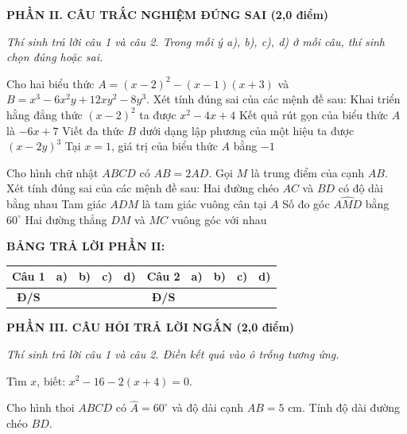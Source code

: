 \documentclass[12pt,a4paper]{article}
\begin{document}
\setcounter{ex}{0}
\noindent\textbf{\large PHẦN II. CÂU TRẮC NGHIỆM ĐÚNG SAI (2,0 điểm)}

\textit{Thí sinh trả lời câu 1 và câu 2. Trong mỗi ý a), b), c), d) ở mỗi câu, thí sinh chọn đúng hoặc sai.}

\vspace{1mm}
\begin{ex}
Cho hai biểu thức $A = (x - 2)^2 - (x - 1)(x + 3)$ và $B = x^3 - 6x^2y + 12xy^2 - 8y^3$. Xét tính đúng sai của các mệnh đề sau:
\choiceTF
{\True Khai triển hằng đẳng thức $(x - 2)^2$ ta được $x^2 - 4x + 4$}
{\True Kết quả rút gọn của biểu thức $A$ là $-6x + 7$}
{\True Viết đa thức $B$ dưới dạng lập phương của một hiệu ta được $(x - 2y)^3$}
{Tại $x = 1$, giá trị của biểu thức $A$ bằng $-1$}
\end{ex}

\begin{ex}
Cho hình chữ nhật $ABCD$ có $AB = 2AD$. Gọi $M$ là trung điểm của cạnh $AB$. Xét tính đúng sai của các mệnh đề sau:
\choiceTF
{\True Hai đường chéo $AC$ và $BD$ có độ dài bằng nhau}
{\True Tam giác $ADM$ là tam giác vuông cân tại $A$}
{Số đo góc $\widehat{AMD}$ bằng $60^\circ$}
{\True Hai đường thẳng $DM$ và $MC$ vuông góc với nhau}
\end{ex}


\noindent\textbf{BẢNG TRẢ LỜI PHẦN II:}
\begin{center}
\begin{tabular}{|c|c|c|c|c||c|c|c|c|c|}
\hline
\textbf{Câu 1} & \textbf{a)} & \textbf{b)} & \textbf{c)} & \textbf{d)} & \textbf{Câu 2} & \textbf{a)} & \textbf{b)} & \textbf{c)} & \textbf{d)} \\
\hline
\textbf{Đ/S} & \rule{0pt}{0.6cm} & & & & \textbf{Đ/S} & & & & \\
\hline
\end{tabular}
\end{center}
\vspace{2mm}

\setcounter{ex}{0}
\noindent\textbf{\large PHẦN III. CÂU HỎI TRẢ LỜI NGẮN (2,0 điểm)}

\textit{Thí sinh trả lời câu 1 và câu 2. Điền kết quả vào ô trống tương ứng.}

\vspace{1mm}
\begin{ex}
Tìm $x$, biết: $x^2 - 16 - 2(x + 4) = 0$. 
\end{ex}

\begin{ex}
Cho hình thoi $ABCD$ có $\widehat{A} = 60^\circ$ và độ dài cạnh $AB = 5\text{ cm}$. Tính độ dài đường chéo $BD$. 
\end{ex}
\end{document}
